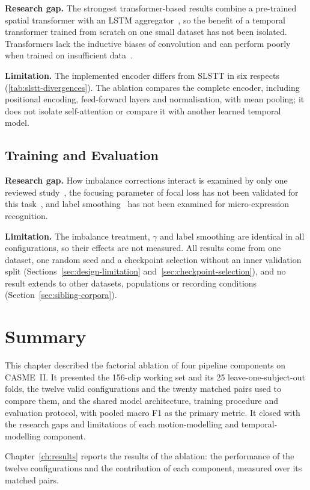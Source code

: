 \textbf{Research gap.} The strongest transformer-based results combine a pre-trained spatial transformer with an LSTM aggregator~\cite{zhang2022}, so the benefit of a temporal transformer trained from scratch on one small dataset has not been isolated. Transformers lack the inductive biases of convolution and can perform poorly when trained on insufficient data~\cite{dosovitskiy2021}.

\textbf{Limitation.} The implemented encoder differs from SLSTT in six respects (\autoref{tab:slstt-divergences}). The ablation compares the complete encoder, including positional encoding, feed-forward layers and normalisation, with mean pooling; it does not isolate self-attention or compare it with another learned temporal model.

\subsection{Training and Evaluation}
\label{sec:gaps-training}

\textbf{Research gap.} How imbalance corrections interact is examined by only one reviewed study~\cite{xia2020a}, the focusing parameter of focal loss has not been validated for this task~\cite{zhaoS2021}, and label smoothing~\cite{szegedy2016} has not been examined for micro-expression recognition.

\textbf{Limitation.} The imbalance treatment, $\gamma$ and label smoothing are identical in all configurations, so their effects are not measured. All results come from one dataset, one random seed and a checkpoint selection without an inner validation split (Sections~\ref{sec:design-limitation} and~\ref{sec:checkpoint-selection}), and no result extends to other datasets, populations or recording conditions (Section~\ref{sec:sibling-corpora}).


\section{Summary}
\label{sec:ch4-conclusion}

This chapter described the factorial ablation of four pipeline components on CASME~II. It presented the 156-clip working set and its 25 leave-one-subject-out folds, the twelve valid configurations and the twenty matched pairs used to compare them, and the shared model architecture, training procedure and evaluation protocol, with pooled macro F1 as the primary metric. It closed with the research gaps and limitations of each motion-modelling and temporal-modelling component.

Chapter~\ref{ch:results} reports the results of the ablation: the performance of the twelve configurations and the contribution of each component, measured over its matched pairs.
